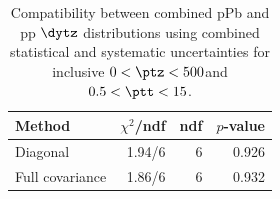\begin{table}[htp!]
\centering
\begin{tabular}{|l|r|r|r|}
\hline
Method & $\chi^2$/ndf & ndf & $p$-value \\
\hline
Diagonal & 1.94/6 & 6 & 0.926 \\
Full covariance & 1.86/6 & 6 & 0.932 \\
\hline
\end{tabular}
\caption{Compatibility between combined pPb and pp $\dytz$ distributions using combined statistical and systematic uncertainties for inclusive $0 < \ptz < 500$\GeV and $0.5 < \ptt < 15$\GeV.}
\label{table:chisq_deta}
\end{table}
